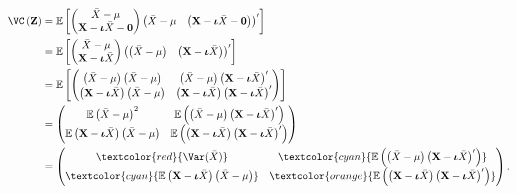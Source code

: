 \documentclass{tstextbook}
\begin{document}
\begin{example}
\begin{align*}
	\VC\left(\textbf{Z}\right) & =\mathbb{E}\left[\begin{pmatrix}\bar{X}-\mu\\
		\textbf{X}-\boldsymbol{\iota}\bar{X}-\boldsymbol{0}
	\end{pmatrix}\begin{pmatrix}\bar{X}-\mu & \left(\textbf{X}-\boldsymbol{\iota}\bar{X}-\boldsymbol{0}\right)\end{pmatrix}^{\prime}\right]\\
	& =\mathbb{E}\left[\begin{pmatrix}\bar{X}-\mu\\
		\textbf{X}-\boldsymbol{\iota}\bar{X}
	\end{pmatrix}\begin{pmatrix}\left(\bar{X}-\mu\right) & \left(\textbf{X}-\boldsymbol{\iota}\bar{X}\right)\end{pmatrix}^{\prime}\right]\\
	& =\mathbb{E}\left[\begin{pmatrix}\left(\bar{X}-\mu\right)\left(\bar{X}-\mu\right) & \left(\bar{X}-\mu\right)\left(\textbf{X}-\boldsymbol{\iota}\bar{X}\right)^{\prime}\\
		\left(\textbf{X}-\boldsymbol{\iota}\bar{X}\right)\left(\bar{X}-\mu\right) & \left(\textbf{X}-\boldsymbol{\iota}\bar{X}\right)\left(\textbf{X}-\boldsymbol{\iota}\bar{X}\right)^{\prime}
	\end{pmatrix}\right]\\
	& =\begin{pmatrix}\mathbb{E}\left(\bar{X}-\mu\right)^{2} & \mathbb{E}\left(\left(\bar{X}-\mu\right)\left(\textbf{X}-\boldsymbol{\iota}\bar{X}\right)^{\prime}\right)\\
		\mathbb{E}\left(\textbf{X}-\boldsymbol{\iota}\bar{X}\right)\left(\bar{X}-\mu\right) & \mathbb{E}\left(\left(\textbf{X}-\boldsymbol{\iota}\bar{X}\right)\left(\textbf{X}-\boldsymbol{\iota}\bar{X}\right)^{\prime}\right)
	\end{pmatrix}\\
	& =\begin{pmatrix}\textcolor{red}{\Var(\bar{X})} & \textcolor{cyan}{\mathbb{E}\left(\left(\bar{X}-\mu\right)\left(\textbf{X}-\boldsymbol{\iota}\bar{X}\right)^{\prime}\right)}\\
		\textcolor{cyan}{\mathbb{E}\left(\textbf{X}-\boldsymbol{\iota}\bar{X}\right)\left(\bar{X}-\mu\right)} & \textcolor{orange}{\mathbb{E}\left(\left(\textbf{X}-\boldsymbol{\iota}\bar{X}\right)\left(\textbf{X}-\boldsymbol{\iota}\bar{X}\right)^{\prime}\right)}
	\end{pmatrix}.
\end{align*}




\end{example}
\end{document}
